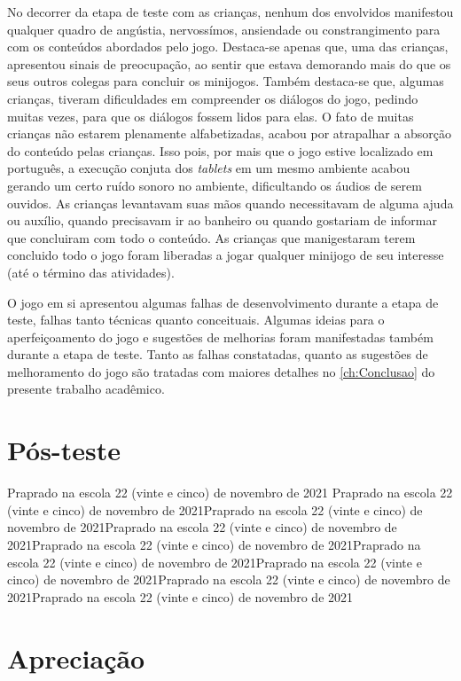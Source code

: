 No decorrer da etapa de teste com as crianças, nenhum dos envolvidos manifestou qualquer quadro de angústia, nervossímos, ansiendade ou constrangimento para com os conteúdos abordados pelo jogo. Destaca-se apenas que, uma das crianças, apresentou sinais de preocupação, ao sentir que estava demorando mais do que os seus outros colegas para concluir os minijogos. Também destaca-se que, algumas crianças, tiveram dificuldades em compreender os diálogos do jogo, pedindo muitas vezes, para que os diálogos fossem lidos para elas. O fato de muitas crianças não estarem plenamente alfabetizadas, acabou por atrapalhar a absorção do conteúdo pelas crianças. Isso pois, por mais que o jogo estive localizado em português, a execução conjuta dos \textit{tablets} em um mesmo ambiente acabou gerando um certo ruído sonoro no ambiente, dificultando os áudios de serem ouvidos. As crianças levantavam suas mãos quando necessitavam de alguma ajuda ou auxílio, quando precisavam ir ao banheiro ou quando gostariam de informar que concluiram com todo o conteúdo. As crianças que manigestaram terem concluido todo o jogo foram liberadas a jogar qualquer minijogo de seu interesse (até o término das atividades). 

O jogo em si apresentou algumas falhas de desenvolvimento durante a etapa de teste, falhas tanto técnicas quanto conceituais. Algumas ideias para o aperfeiçoamento do jogo e sugestões de melhorias foram manifestadas também durante a etapa de teste. Tanto as falhas constatadas, quanto as sugestões de melhoramento do jogo são tratadas com maiores detalhes no \autoref{ch:Conclusao} do presente trabalho acadêmico.



\section{Pós-teste}\label{sec:postes}


Praprado na escola 22 (vinte e cinco) de novembro de 2021 Praprado na escola 22 (vinte e cinco) de novembro de 2021Praprado na escola 22 (vinte e cinco) de novembro de 2021Praprado na escola 22 (vinte e cinco) de novembro de 2021Praprado na escola 22 (vinte e cinco) de novembro de 2021Praprado na escola 22 (vinte e cinco) de novembro de 2021Praprado na escola 22 (vinte e cinco) de novembro de 2021Praprado na escola 22 (vinte e cinco) de novembro de 2021Praprado na escola 22 (vinte e cinco) de novembro de 2021

\section{Apreciação}\label{sec:apreciar}

